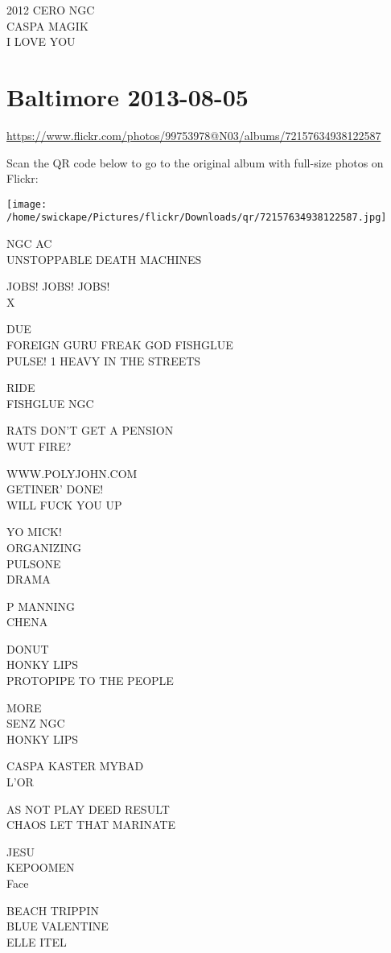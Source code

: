\documentclass[10pt,letterpaper]{article}
\begin{document}
2012 CERO NGC\\
CASPA MAGIK\\
I LOVE YOU


\section*{Baltimore 2013-08-05}

\url{https://www.flickr.com/photos/99753978@N03/albums/72157634938122587}

Scan the QR code below to go to the original album with full-size photos on Flickr:

\texttt{[image: /home/swickape/Pictures/flickr/Downloads/qr/72157634938122587.jpg]}


NGC AC\\
UNSTOPPABLE DEATH MACHINES

JOBS! JOBS! JOBS!\\
X

DUE\\
FOREIGN GURU FREAK GOD FISHGLUE\\
PULSE! 1 HEAVY IN THE STREETS

RIDE\\
FISHGLUE NGC

RATS DON'T GET A PENSION\\
WUT FIRE?

WWW.POLYJOHN.COM\\
GETINER' DONE!\\
WILL FUCK YOU UP

YO MICK!\\
ORGANIZING\\
PULSONE\\
DRAMA

P MANNING\\
CHENA

DONUT\\
HONKY LIPS\\
PROTOPIPE TO THE PEOPLE

MORE\\
SENZ NGC\\
HONKY LIPS

CASPA KASTER MYBAD\\
L'OR

AS NOT PLAY DEED RESULT\\
CHAOS LET THAT MARINATE

JESU\\
KEPOOMEN\\
Face

BEACH TRIPPIN\\
BLUE VALENTINE\\
ELLE ITEL
\end{document}
